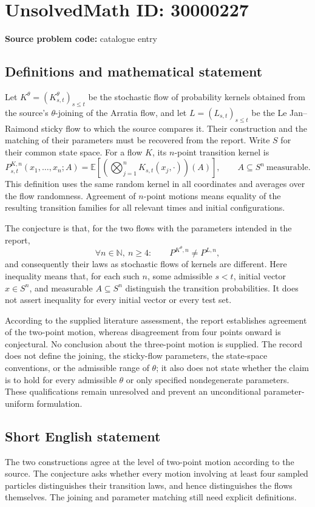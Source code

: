 \documentclass[11pt]{article}
\newcommand{\N}{\mathbb{N}}
\newcommand{\E}{\mathbb{E}}
\begin{document}
\section*{UnsolvedMath ID: 30000227}
\textbf{Source problem code:} catalogue entry
\subsection{Definitions and mathematical statement}
Let $K^{\theta}=(K^{\theta}_{s,t})_{s\le t}$ be the stochastic flow of probability kernels obtained from the source's $\theta$-joining of the Arratia flow, and let $L=(L_{s,t})_{s\le t}$ be the Le Jan--Raimond sticky flow to which the source compares it. Their construction and the matching of their parameters must be recovered from the report. Write $S$ for their common state space. For a flow $K$, its $n$-point transition kernel is
\[
 P^{K,n}_{s,t}(x_1,\ldots,x_n; A)
 =\E\!\left[\left(\bigotimes_{j=1}^n K_{s,t}(x_j,\cdot)\right)(A)\right],
 \qquad A\subseteq S^n\ \text{measurable}.
\]
This definition uses the same random kernel in all coordinates and averages over the flow randomness. Agreement of $n$-point motions means equality of the resulting transition families for all relevant times and initial configurations.

The conjecture is that, for the two flows with the parameters intended in the report,
\[
 \forall n\in\N,\ n\ge4:\qquad
 P^{K^{\theta},n}\ne P^{L,n},
\]
and consequently their laws as stochastic flows of kernels are different. Here inequality means that, for each such $n$, some admissible $s<t$, initial vector $x\in S^n$, and measurable $A\subseteq S^n$ distinguish the transition probabilities. It does not assert inequality for every initial vector or every test set.

According to the supplied literature assessment, the report establishes agreement of the two-point motion, whereas disagreement from four points onward is conjectural. No conclusion about the three-point motion is supplied. The record does not define the joining, the sticky-flow parameters, the state-space conventions, or the admissible range of $\theta$; it also does not state whether the claim is to hold for every admissible $\theta$ or only specified nondegenerate parameters. These qualifications remain unresolved and prevent an unconditional parameter-uniform formulation.
\subsection{Short English statement}
The two constructions agree at the level of two-point motion according to the source. The conjecture asks whether every motion involving at least four sampled particles distinguishes their transition laws, and hence distinguishes the flows themselves. The joining and parameter matching still need explicit definitions.
\end{document}
